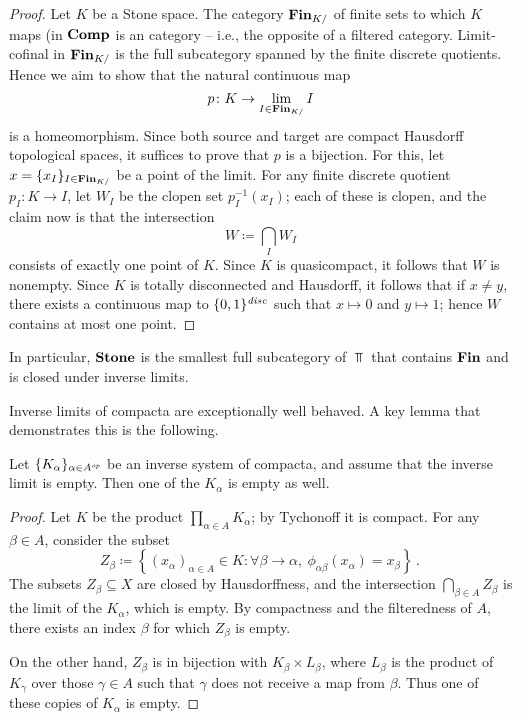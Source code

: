 \begin{proof}
	Let $ K $ be a Stone space.
	The category $ \textbf{\textup{Fin}}_{K/} $ of finite sets to which $ K $ maps (in $ \textbf{\textup{Comp}} $ is an  category -- i.e., the opposite of a filtered category.
	Limit-cofinal in $ \textbf{\textup{Fin}}_{K/} $ is the full subcategory spanned by the finite discrete quotients.
	Hence we aim to show that the natural continuous map
	\[
		p \colon K \to \lim_{I \in \textbf{\textup{Fin}}_{K/}} I
	\]
	is a homeomorphism.
	Since both source and target are compact Hausdorff topological spaces, it suffices to prove that $ p $ is a bijection.
	For this, let $ x = \{ x_I \}_{I \in \textbf{\textup{Fin}}_{K/}} $ be a point of the limit.
	For any finite discrete quotient $p_I \colon K \to I $, let $ W_I $ be the clopen set $ p_I^{-1}(x_I) $;
	each of these is clopen, and the claim now is that the intersection
	\[
		W \coloneq \bigcap_I W_I
	\]
	consists of exactly one point of $ K $.
	Since $ K $ is quasicompact, it follows that $ W $ is nonempty.
	Since $ K $ is totally disconnected and Hausdorff, it follows that if $ x \neq y $, there exists a continuous map to $\{ 0,1 \}^{\textit{disc}}$ such that $ x \mapsto 0 $ and $ y \mapsto 1 $;
	hence $ W $ contains at most one point.
\end{proof}

\begin{nul}
	In particular, $ \textbf{\textup{Stone}} $ is the smallest full subcategory of $ \Top $ that contains $ \textbf{\textup{Fin}} $ and is closed under inverse limits.
\end{nul}

Inverse limits of compacta are exceptionally well behaved.
A key lemma that demonstrates this is the following.

\begin{lem} \label{emptyinverselimitofcompacta}
	Let $ \{ K_{\alpha} \}_{\alpha \in A^{\textit{op}}} $ be an inverse system of compacta, and assume that the inverse limit is empty.
	Then one of the $ K_{\alpha} $ is empty as well.
\end{lem}

\begin{proof}
	Let $ K $ be the product $\prod_{\alpha \in A} K_{\alpha}$;
	by Tychonoff it is compact.
	For any $ \beta \in A $, consider the subset
	\[
		Z_{\beta} \coloneq \left\{ (x_{\alpha})_{\alpha \in A} \in K : \forall \beta \to \alpha,\ \phi_{\alpha\beta} (x_{\alpha}) = x_{\beta} \right\} \period
	\]
	The subsets $Z_{\beta} \subseteq X$ are closed by Hausdorffness, and the intersection $\bigcap_{\beta \in A} Z_{\beta}$ is the limit of the $ K_{\alpha} $, which is empty.
	By compactness and the filteredness of $ A $, there exists an index $ \beta $ for which $ Z_{\beta} $ is empty.

	On the other hand, $Z_{\beta}$ is in bijection with $ K_{\beta} \times L_{\beta} $, where $ L_{\beta} $ is the product of $ K_{\gamma} $ over those $ \gamma \in A $ such that $ \gamma $ does not receive a map from $ \beta $.
	Thus one of these copies of $ K_{\alpha} $ is empty.
\end{proof}

